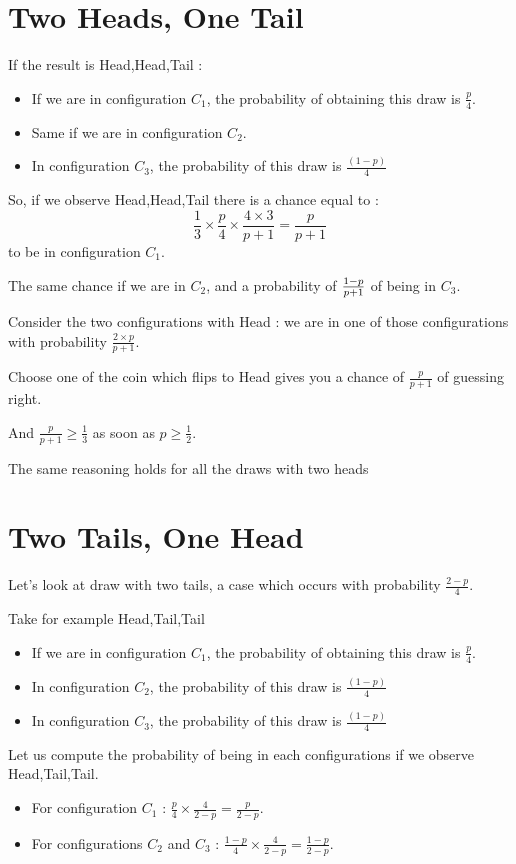 \documentclass[11pt]{article}
\begin{document}
\section*{Two Heads, One Tail}
If the result is Head,Head,Tail : 
\begin{itemize}
\item If we are in configuration $C_1$, the probability of obtaining this draw is $\frac{p}{4}$. 
\item Same if we are in configuration $C_2$. 
\item In configuration $C_3$, the probability of this draw is $\frac{(1-p)}{4}$
\end{itemize}
So, if we observe Head,Head,Tail there is a chance equal to  : 
$$\frac{1}{3}\times\frac{p}{4}\times \frac{4\times 3}{p+1}=\frac{p}{p+1}$$
to be in configuration $C_1$.

The same chance if we are in $C_2$, and a probability of ${1-p}\over{p+1}$ of being in $C_3$.

Consider the two configurations with Head : we are in one of those configurations with probability $\frac{2\times p}{p+1}$.

Choose one of the coin which flips to Head gives you a chance of $\frac{p}{p+1}$ of guessing right. 

And $\frac{p}{p+1} \ge \frac{1}{3}$ as soon as $p \ge \frac{1}{2}$.

The same reasoning holds for all the draws with two heads

\section*{Two Tails, One Head}

Let's look at draw with two tails, a case which occurs with probability $\frac{2-p}{4}$.

Take  for example Head,Tail,Tail
\begin{itemize}
\item If we are in configuration $C_1$, the probability of obtaining this draw is $\frac{p}{4}$. 
\item In configuration $C_2$, the probability of this draw is $\frac{(1-p)}{4}$
\item In configuration $C_3$, the probability of this draw is $\frac{(1-p)}{4}$
\end{itemize}

Let us compute the probability of being in each configurations if we observe Head,Tail,Tail. 

\begin{itemize}
\item For configuration $C_1$ : $\frac{p}{4}\times \frac{4}{2-p}=\frac{p}{2-p}$. 
\item For configurations $C_2$ and $C_3$ :  $\frac{1-p}{4}\times \frac{4}{2-p}=\frac{1-p}{2-p}$. 
\end{itemize}
\end{document}
